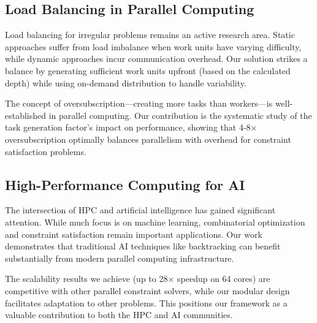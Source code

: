 \subsection{Load Balancing in Parallel Computing}
Load balancing for irregular problems remains an active research area. Static approaches suffer from load imbalance when work units have varying difficulty, while dynamic approaches incur communication overhead. Our solution strikes a balance by generating sufficient work units upfront (based on the calculated depth) while using on-demand distribution to handle variability.

The concept of oversubscription—creating more tasks than workers—is well-established in parallel computing. Our contribution is the systematic study of the task generation factor's impact on performance, showing that 4-8× oversubscription optimally balances parallelism with overhead for constraint satisfaction problems.

\subsection{High-Performance Computing for AI}
The intersection of HPC and artificial intelligence has gained significant attention. While much focus is on machine learning, combinatorial optimization and constraint satisfaction remain important applications. Our work demonstrates that traditional AI techniques like backtracking can benefit substantially from modern parallel computing infrastructure.

The scalability results we achieve (up to 28× speedup on 64 cores) are competitive with other parallel constraint solvers, while our modular design facilitates adaptation to other problems. This positions our framework as a valuable contribution to both the HPC and AI communities.